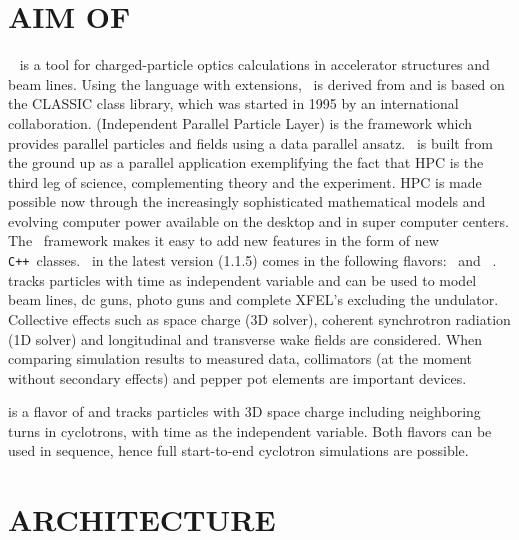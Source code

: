 \documentclass[acus]{JAC2003}
\begin{document}
\section{AIM OF \opal}
\opal\ \cite{opal} is a tool for charged-particle optics calculations in
accelerator structures and beam lines. 
Using the \mad language with extensions, \opal\ is derived from \madninep \cite{mad9} and is based 
on the
CLASSIC \cite{classic} class library,
which was started in 1995 by an international collaboration.  \ippl (Independent Parallel Particle Layer) \cite{ippl} is
the framework which provides parallel particles and fields using a data parallel ansatz. 
\opal\ is built from the ground up as a parallel application exemplifying the fact that HPC 
is the third leg of science, complementing theory and the experiment. 
HPC is made possible now through the increasingly sophisticated mathematical models and evolving computer power available on the desktop
and in super computer centers. The \opal\ framework makes 
it easy to add new features in the form of new \texttt{C++}~classes. \opal\ in the latest version (1.1.5) comes in the following flavors:
{\bf\opalcycl}\ and {\bf\opalt}\ .
\opalt  tracks particles with time as independent variable and can be used to model beam lines, dc guns, photo guns and complete XFEL's excluding the undulator. 
Collective effects such as space charge (3D solver), coherent synchrotron radiation (1D solver) and longitudinal and transverse wake fields are considered.
When comparing simulation results to measured data, collimators (at the moment without secondary effects) and pepper pot elements are important devices. 

\opalcycl is a flavor of \opalt and tracks particles with 3D space charge including neighboring turns in cyclotrons, with time as the independent variable. Both flavors can be used in sequence, hence
full start-to-end cyclotron simulations are possible.  

\section{ARCHITECTURE}
\end{document}
